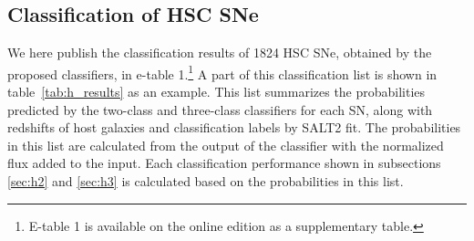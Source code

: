 \documentclass[useamsfonts]{pasj01}
\begin{document}
%
\subsection{Classification of HSC SNe}
%
We here publish the classification results of 1824 HSC SNe, obtained by the proposed classifiers, in e-table 1.\footnote{ E-table 1 is available on the online edition as a supplementary table. }
A part of this classification list is shown in table\ \ref{tab:h_results} as an example.
This list summarizes the probabilities predicted by the two-class and three-class classifiers for each SN, along with redshifts of host galaxies and classification labels by SALT2 fit.
The probabilities in this list are calculated from the output of the classifier with the normalized flux added to the input.
Each classification performance shown in subsections \ref{sec:h2} and \ref{sec:h3} is calculated based on the probabilities in this list.
\end{document}
